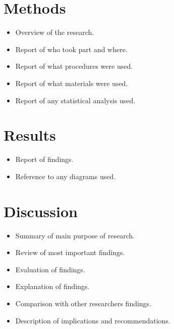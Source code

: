 \documentclass{sig-alternate}
\begin{document}

\section{Methods} %
\label{sec:Methods}
\begin{itemize}
	\item Overview of the research.
	\item Report of who took part and where.
	\item Report of what procedures were used.
	\item Report of what materials were used.
	\item Report of any statistical analysis used.
\end{itemize}


\section{Results} %
\label{sec:Results}
\begin{itemize}
	\item Report of findings.
	\item Reference to any diagrams used.
\end{itemize}

\section{Discussion} %
\label{sec:discussion}
\begin{itemize}
	\item Summary of main purpose of research.
	\item Review of most important findings.
	\item Evaluation of findings.
	\item Explanation of findings.
	\item Comparison with other researchers findings.
	\item Description of implications and recommendations.
\end{itemize}




%
%
\end{document}
